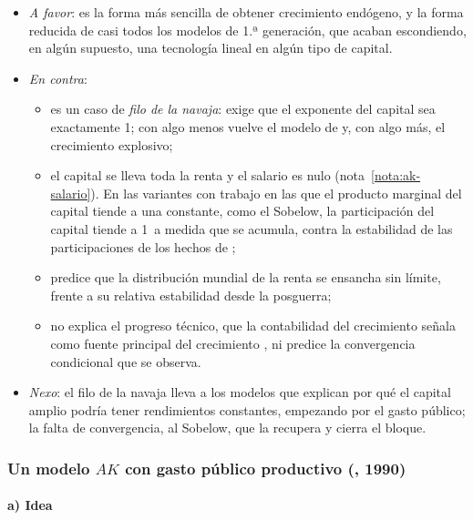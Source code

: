 \documentclass[11pt]{article}
\begin{document}
\begin{itemize}
\item \emph{A favor}: es la forma más sencilla de obtener crecimiento endógeno, y la forma reducida de casi todos los modelos de 1.ª generación, que acaban escondiendo, en algún supuesto, una tecnología lineal en algún tipo de capital.
\item \emph{En contra}:
  \begin{itemize}
  \item es un caso de \emph{filo de la navaja}: exige que el exponente del capital sea exactamente 1; con algo menos vuelve el modelo de  y, con algo más, el crecimiento explosivo\nocite{Solow1994Perspectives};
  \item el capital se lleva toda la renta y el salario es nulo (nota~\ref{nota:ak-salario}). En las variantes con trabajo en las que el producto marginal del capital tiende a una constante, como el Sobelow, la participación del capital tiende a 1~a medida que se acumula, contra la estabilidad de las participaciones de los hechos de  ;
  \item predice que la distribución mundial de la renta se ensancha sin límite, frente a su relativa estabilidad desde la posguerra\nocite{Acemoglu2009};
  \item no explica el progreso técnico, que la contabilidad del crecimiento señala como fuente principal del crecimiento , ni predice la convergencia condicional que se observa.
  \end{itemize}
\item \emph{Nexo}: el filo de la navaja lleva a los modelos que explican por qué el capital amplio podría tener rendimientos constantes, empezando por el gasto público; la falta de convergencia, al Sobelow, que la recupera y cierra el bloque.
\end{itemize}

\subsubsection{Un modelo $AK$ con gasto público productivo (, 1990)}\label{sec:barro}

\paragraph{a) Idea}
\end{document}
